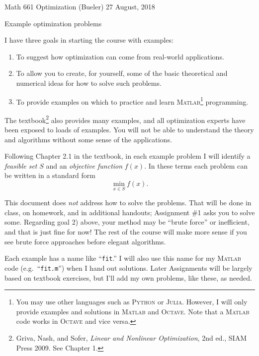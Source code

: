 \documentclass[11pt]{amsart}
\newcommand{\Julia}{\textsc{Julia}\xspace}
\newcommand{\Matlab}{\textsc{Matlab}\xspace}
\newcommand{\Octave}{\textsc{Octave}\xspace}
\newcommand{\Python}{\textsc{Python}\xspace}
\begin{document}
\scriptsize \noindent Math 661 Optimization (Bueler) \hfill 27 August, 2018
\normalsize

\medskip\bigskip
\Large
\centerline{Example optimization problems}

\bigskip\medskip
\normalsize

\thispagestyle{empty}

I have three goals in starting the course with examples:
\renewcommand{\labelenumi}{\arabic{enumi})}
\begin{enumerate}
\item To suggest how optimization can come from real-world applications.
\item To allow you to create, for yourself, some of the basic theoretical and numerical ideas for how to solve such problems.
\item To provide examples on which to practice and learn \Matlab\footnote{You may use other languages such as \Python or \Julia.  However, I will only provide examples and solutions in \Matlab and \Octave.  Note that a \Matlab code works in \Octave and vice versa.} programming.
\end{enumerate}

The textbook\footnote{Griva, Nash, and Sofer, \emph{Linear and Nonlinear Optimization}, 2nd ed., SIAM Press 2009.  See Chapter 1.} also provides many examples, and all optimization experts have been exposed to loads of examples.  You will not be able to understand the theory and algorithms without some sense of the applications.

Following Chapter 2.1 in the textbook, in each example problem I will identify a \emph{feasible set} $S$ and an \emph{objective function} $f(x)$.  In these terms each problem can be written in a standard form
    $$\min_{x\in S} f(x).$$

This document does \emph{not} address how to solve the problems.  That will be done in class, on homework, and in additional handouts; Assignment \#1 asks you to solve some.  Regarding goal 2) above, your method may be ``brute force'' or inefficient, and that is just fine for now!  The rest of the course will make more sense if you see brute force approaches before elegant algorithms.

Each example has a name like ``\texttt{fit}.''  I will also use this name for my \Matlab code (e.g.~``\texttt{fit.m}'') when I hand out solutions.  Later Assignments will be largely based on textbook exercises, but I'll add my own problems, like these, as needed.
\end{document}
